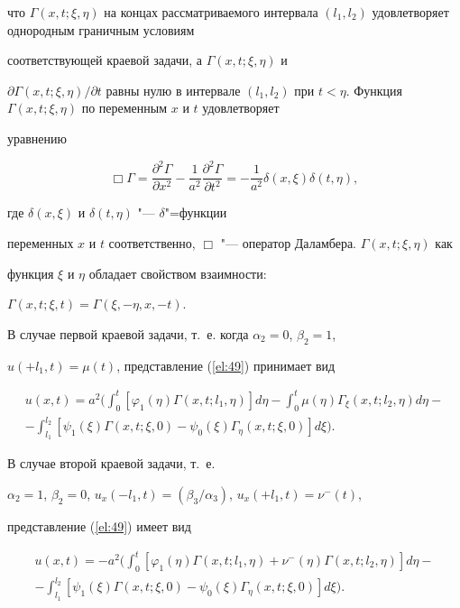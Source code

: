 что $\Gamma(x,t;\xi,\eta)$ на концах рассматриваемого интервала $(l_1,l_2)$ удовлетворяет однородным граничным условиям

соответствующей краевой задачи, а $\Gamma(x,t;\xi,\eta)$ и

$\partial\Gamma(x,t;\xi,\eta)/\partial t$ равны нулю в интервале $(l_1,l_2)$ при $t<\eta$. Функция $\Gamma(x,t;\xi,\eta)$ по переменным $x$ и $t$ удовлетворяет

уравнению

$$

\Box\Gamma=\frac{\partial^2\Gamma}{\partial

x^2}-\frac{1}{a^2}\frac{\partial^2\Gamma}{\partial

t^2}=-\frac{1}{a^2}\delta(x,\xi)\delta(t,\eta),

$$

где $\delta(x,\xi)$ и $\delta(t,\eta)$ "--- $\delta$"=функции

переменных $x$ и $t$ соответственно, $\Box$ "--- оператор Даламбера. $\Gamma(x,t;\xi,\eta)$ как

функция $\xi$ и $\eta$ обладает свойством взаимности:

$\Gamma(x,t;\xi,t)=\Gamma(\xi,-\eta,x,-t)$.



В случае первой краевой задачи, т.~е. когда $\alpha_2=0$, $\beta_2=1$,

$u(+l_1,t)=\mu(t)$, представление (\ref{el:49}) принимает вид

\begin{multline*}

u(x,t)=a^2\biggl(\int_0^t[\varphi_1(\eta)\Gamma(x,t;l_1,\eta)]d\eta-\int_0^t\mu(\eta)\Gamma_{\xi}(x,t;l_2,\eta)d\eta-\\

-\int_{l_1}^{l_2}[\psi_1(\xi)\Gamma(x,t;\xi,0)-\psi_0(\xi)\Gamma_{\eta}(x,t;\xi,0)]d\xi\biggr).

\end{multline*}



В случае второй краевой задачи, т.~е.

$\alpha_2=1$, $\beta_2=0$, $u_x(-l_1,t)=(\beta_3/\alpha_3)$, $u_x(+l_1,t)=\nu^-(t)$,

представление (\ref{el:49}) имеет вид

\begin{multline*}

u(x,t)=-a^2\biggl(\int_0^t[\varphi_1(\eta)\Gamma(x,t;l_1,\eta)+\nu^-(\eta)\Gamma(x,t;l_2,\eta)]d\eta-\\

-\int_{l_1}^{l_2}[\psi_1(\xi)\Gamma(x,t;\xi,0)-\psi_0(\xi)\Gamma_{\eta}(x,t;\xi,0)]d\xi\biggr).

\end{multline*}



